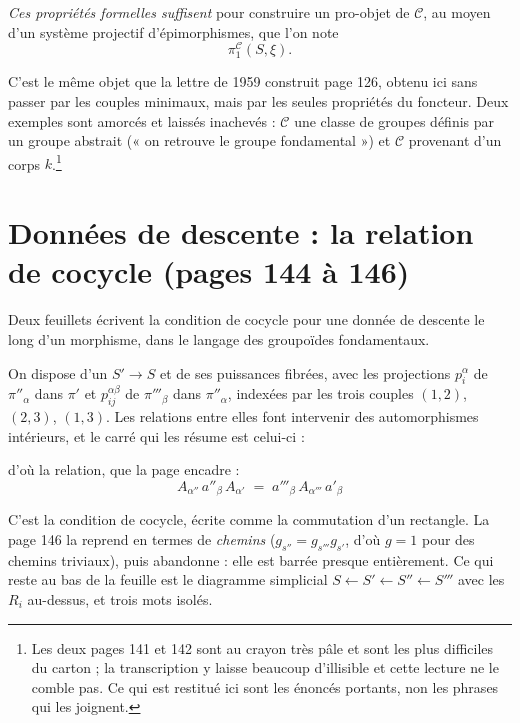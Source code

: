 \documentclass[11pt,a4paper]{article}
\begin{document}
\emph{Ces propriétés formelles suffisent} pour construire un pro-objet de
$\mathcal{C}$, au moyen d'un système projectif d'épimorphismes, que l'on note
\[
  \pi_{1}^{\mathcal{C}}(S, \xi) .
\]

C'est le même objet que la lettre de 1959 construit page 126, obtenu ici sans
passer par les couples minimaux, mais par les seules propriétés du foncteur.
Deux exemples sont amorcés et laissés inachevés : $\mathcal{C}$ une classe de
groupes définis par un groupe abstrait (« on retrouve le groupe
fondamental ») et $\mathcal{C}$ provenant d'un corps
$k$.\footnote{Les deux pages 141 et 142 sont au crayon très pâle et sont les
plus difficiles du carton ; la transcription y laisse beaucoup d'illisible et
cette lecture ne le comble pas. Ce qui est restitué ici sont les énoncés
portants, non les phrases qui les joignent.}

\section*{Données de descente : la relation de cocycle (pages 144 à 146)}

Deux feuillets écrivent la condition de cocycle pour une donnée de descente le
long d'un morphisme, dans le langage des groupoïdes fondamentaux.

On dispose d'un $S' \to S$ et de ses puissances fibrées, avec les projections
$p_{i}^{\alpha}$ de $\pi''_{\alpha}$ dans $\pi'$ et $p_{ij}^{\alpha\beta}$ de
$\pi'''_{\beta}$ dans $\pi''_{\alpha}$, indexées par les trois couples
$(1,2)$, $(2,3)$, $(1,3)$. Les relations entre elles font intervenir des
automorphismes intérieurs, et le carré qui les résume est celui-ci :


d'où la relation, que la page encadre :
\[
  \boxed{\; A_{\alpha''}\, a''_{\beta}\, A_{\alpha'} \;=\;
  a'''_{\beta}\, A_{\alpha'''}\, a'_{\beta} \;}
\]

C'est la condition de cocycle, écrite comme la commutation d'un rectangle. La
page 146 la reprend en termes de \emph{chemins} ($g_{s''} = g_{s'''}g_{s'}$,
d'où $g = 1$ pour des chemins triviaux), puis abandonne : elle est barrée
presque entièrement. Ce qui reste au bas de la feuille est le diagramme
simplicial $S \leftarrow S' \leftarrow S'' \leftarrow S'''$ avec les
$R_{i}$ au-dessus, et trois mots isolés.
\end{document}

